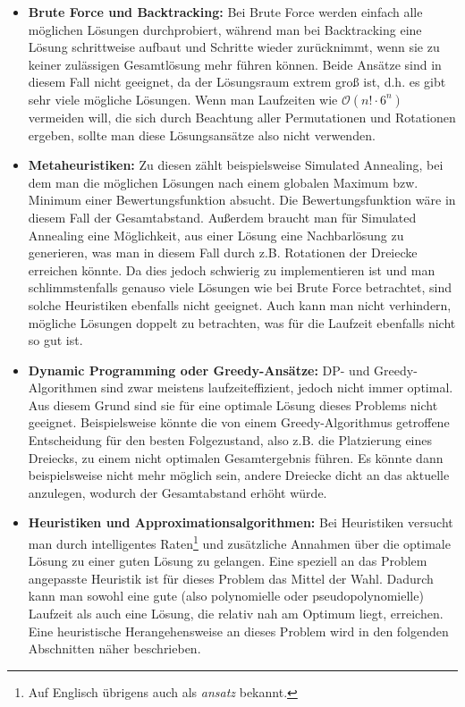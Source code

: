 \documentclass[a4paper, notitlepage, 12pt,headinclude]{scrartcl}
\begin{document}
 \begin{itemize}
 	\item \textbf{Brute Force und Backtracking:} Bei Brute Force werden einfach alle möglichen Lösungen durchprobiert, während man bei Backtracking eine Lösung schrittweise aufbaut und Schritte wieder zurücknimmt, wenn sie zu keiner zulässigen Gesamtlösung mehr führen können. Beide Ansätze sind in diesem Fall nicht geeignet, da der Lösungsraum extrem groß ist, d.h. es gibt sehr viele mögliche Lösungen. Wenn man Laufzeiten wie $\mathcal{O}(n! \cdot 6^n)$ vermeiden will, die sich durch Beachtung aller Permutationen und Rotationen ergeben, sollte man diese Lösungsansätze also nicht verwenden.
 	\item \textbf{Metaheuristiken:} Zu diesen zählt beispielsweise Simulated Annealing, bei dem man die möglichen Lösungen nach einem globalen Maximum bzw. Minimum einer Bewertungsfunktion absucht. Die Bewertungsfunktion wäre in diesem Fall der Gesamtabstand. Außerdem braucht man für Simulated Annealing eine Möglichkeit, aus einer Lösung eine Nachbarlösung zu generieren, was man in diesem Fall durch z.B. Rotationen der Dreiecke erreichen könnte. Da dies jedoch schwierig zu implementieren ist und man schlimmstenfalls genauso viele Lösungen wie bei Brute Force betrachtet, sind solche Heuristiken ebenfalls nicht geeignet. Auch kann man nicht verhindern, mögliche Lösungen doppelt zu betrachten, was für die Laufzeit ebenfalls nicht so gut ist.
 	\item \textbf{Dynamic Programming oder Greedy-Ansätze:} DP- und Greedy-Algorithmen sind zwar meistens laufzeiteffizient, jedoch nicht immer optimal. Aus diesem Grund sind sie für eine optimale Lösung dieses Problems nicht geeignet. Beispielsweise könnte die von einem Greedy-Algorithmus getroffene Entscheidung für den besten Folgezustand, also z.B. die Platzierung eines Dreiecks, zu einem nicht optimalen Gesamtergebnis führen. Es könnte dann beispielsweise nicht mehr möglich sein, andere Dreiecke dicht an das aktuelle anzulegen, wodurch der Gesamtabstand erhöht würde.
 	\item \textbf{Heuristiken und Approximationsalgorithmen:} Bei Heuristiken versucht man durch intelligentes Raten\footnote{Auf Englisch übrigens auch als \textit{ansatz} bekannt.} und zusätzliche Annahmen über die optimale Lösung zu einer guten Lösung zu gelangen. Eine speziell an das Problem angepasste Heuristik ist für dieses Problem das Mittel der Wahl. Dadurch kann man sowohl eine gute (also polynomielle oder pseudopolynomielle) Laufzeit als auch eine Lösung, die relativ nah am Optimum liegt, erreichen. Eine heuristische Herangehensweise an dieses Problem wird in den folgenden Abschnitten näher beschrieben.
 \end{itemize}
\end{document}
